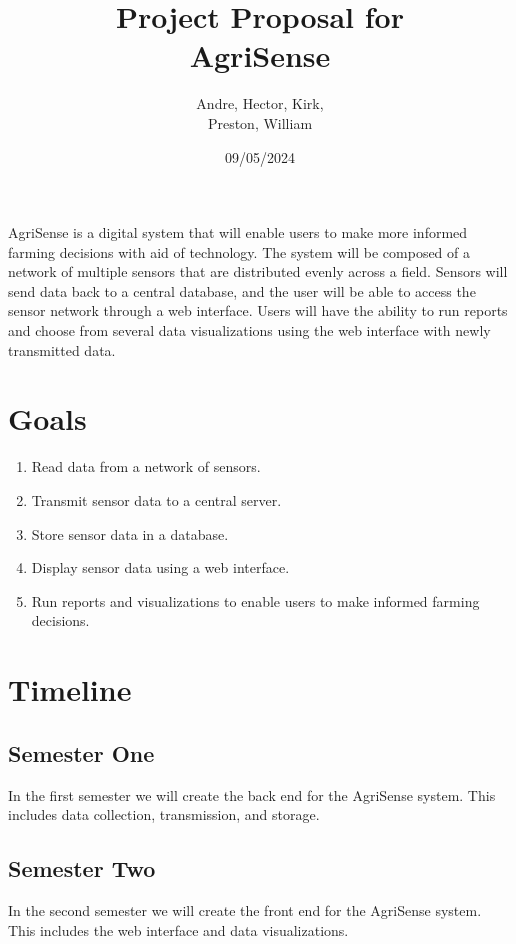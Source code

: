 \documentclass{article}
\title{Project Proposal for \\ AgriSense}
\author{Andre, Hector, Kirk,  \\ Preston, William}
\date{09/05/2024}
\begin{document}
\maketitle
\thispagestyle{empty}

AgriSense is a digital system that will enable users to make more informed farming decisions with aid of technology.
The system will be composed of a network of multiple sensors that are distributed evenly across a field. Sensors will send data back to a central
database, and the user will be able to access the sensor network through a web interface. Users will have the ability to run reports and choose
from several data visualizations using the web interface with newly transmitted data.

\section*{Goals}
\begin{enumerate}
\item Read data from a network of sensors.
\item Transmit sensor data to a central server.
\item Store sensor data in a database.
\item Display sensor data using a web interface.
\item Run reports and visualizations to enable users to make informed farming decisions.
\end{enumerate}

\section*{Timeline}
\subsection*{Semester One}
In the first semester we will create the back end for the AgriSense system. This includes data collection, transmission,
and storage.
\subsection*{Semester Two}
In the second semester we will create the front end for the AgriSense system. This includes the web interface 
and data visualizations.
\end{document}
